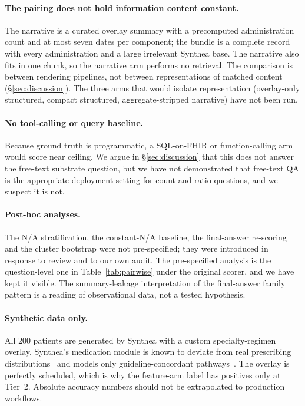 \paragraph{The pairing does not hold information content constant.}
The narrative is a curated overlay summary with a precomputed administration count and
at most seven dates per component; the bundle is a complete record with every
administration and a large irrelevant Synthea base.  The narrative also fits in one
chunk, so the narrative arm performs no retrieval.  The comparison is between rendering
pipelines, not between representations of matched content (\S\ref{sec:discussion}).
The three arms that would isolate representation (overlay-only structured, compact
structured, aggregate-stripped narrative) have not been run.

\paragraph{No tool-calling or query baseline.}
Because ground truth is programmatic, a SQL-on-FHIR or function-calling arm would score
near ceiling.  We argue in \S\ref{sec:discussion} that this does not answer the
free-text substrate question, but we have not demonstrated that free-text QA is the
appropriate deployment setting for count and ratio questions, and we suspect it is not.

\paragraph{Post-hoc analyses.}
The N/A stratification, the constant-N/A baseline, the final-answer re-scoring and the
cluster bootstrap were not pre-specified; they were introduced in response to review and
to our own audit.  The pre-specified analysis is the question-level one in
Table~\ref{tab:pairwise} under the original scorer, and we have kept it visible.  The
summary-leakage interpretation of the final-answer family pattern is a reading of
observational data, not a tested hypothesis.

\paragraph{Synthetic data only.}
All 200 patients are generated by Synthea with a custom specialty-regimen overlay.
Synthea's medication module is known to deviate from real prescribing
distributions~\citep{hodges2023medication} and models only guideline-concordant
pathways~\citep{meeker2022synthea}.  The overlay is perfectly scheduled, which is why
the feature-arm label has positives only at Tier~2.  Absolute accuracy numbers should not
be extrapolated to production workflows.

